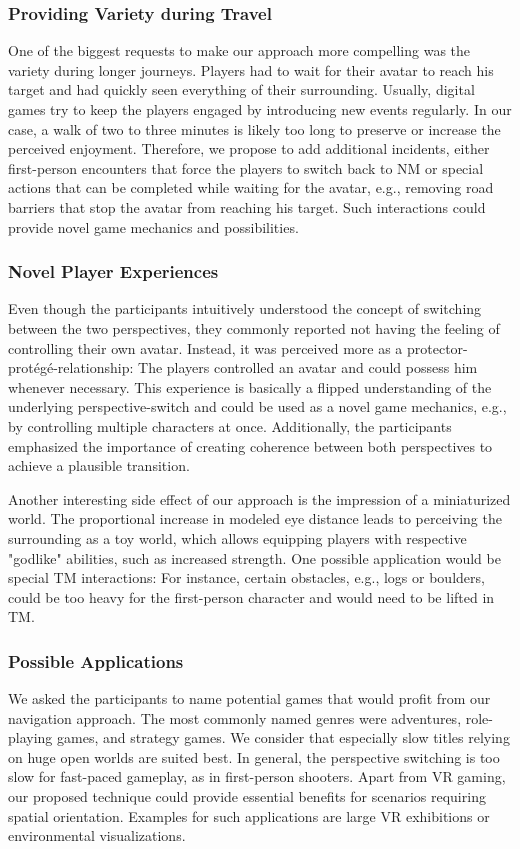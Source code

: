 \documentclass{sigchi}
\begin{document}
\subsubsection{Providing Variety during Travel}
One of the biggest requests to make our approach more compelling was the variety during longer journeys. Players had to wait for their avatar to reach his target and had quickly seen everything of their surrounding. Usually, digital games try to keep the players engaged by introducing new events regularly. In our case, a walk of two to three minutes is likely too long to preserve or increase the perceived enjoyment. Therefore, we propose to add additional incidents, either first-person encounters that force the players to switch back to NM or special actions that can be completed while waiting for the avatar, e.g., removing road barriers that stop the avatar from reaching his target. Such interactions could provide novel game mechanics and possibilities. 

\subsubsection{Novel Player Experiences}
Even though the participants intuitively understood the concept of switching between the two perspectives, they commonly reported not having the feeling of controlling their own avatar. Instead, it was perceived more as a protector-prot\'{e}g\'{e}-relationship: The players controlled an avatar and could possess him whenever necessary. This experience is basically a flipped understanding of the underlying perspective-switch and could be used as a novel game mechanics, e.g., by controlling multiple characters at once. Additionally, the participants emphasized the importance of creating coherence between both perspectives to achieve a plausible transition.\par
Another interesting side effect of our approach is the impression of a miniaturized world. The proportional increase in modeled eye distance leads to perceiving the surrounding as a toy world, which allows equipping players with respective "godlike" abilities, such as increased strength. One possible application would be special TM interactions: For instance, certain obstacles, e.g., logs or boulders, could be too heavy for the first-person character and would need to be lifted in TM.

\subsubsection{Possible Applications}
We asked the participants to name potential games that would profit from our navigation approach. The most commonly named genres were adventures, role-playing games, and strategy games. We consider that especially slow titles relying on huge open worlds are suited best. In general, the perspective switching is too slow for fast-paced gameplay, as in first-person shooters. Apart from VR gaming, our proposed technique could provide essential benefits for scenarios requiring spatial orientation. Examples for such applications are large VR exhibitions or environmental visualizations.
\end{document}
